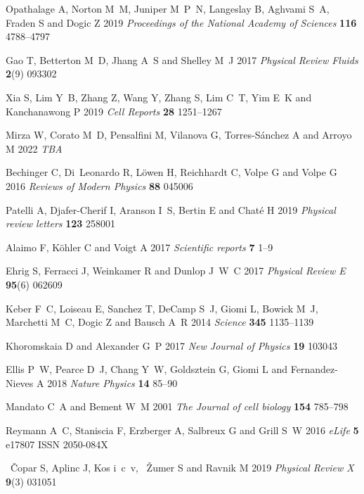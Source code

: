 \documentclass[12pt]{iopart}
\begin{document}
\begin{thebibliography}{100}
				Opathalage A, Norton M~M, Juniper M~P~N, Langeslay B, Aghvami S~A, Fraden S and
				  Dogic Z 2019 {\em Proceedings of the National Academy of Sciences\/} {\bf
				  116} 4788--4797
				
				Gao T, Betterton M~D, Jhang A~S and Shelley M~J 2017 {\em Physical Review Fluids\/}
				  {\bf 2}(9) 093302
				
				Xia S, Lim Y~B, Zhang Z, Wang Y, Zhang S, Lim C~T, Yim E~K and Kanchanawong P
				  2019 {\em Cell Reports\/} {\bf 28} 1251--1267
				
				Mirza W, Corato M~D, Pensalfini M, Vilanova G, Torres-S\'anchez A and Arroyo M
				  2022 {\em TBA\/}
				
				Bechinger C, Di~Leonardo R, L{\"o}wen H, Reichhardt C, Volpe G and Volpe G 2016
				  {\em Reviews of Modern Physics\/} {\bf 88} 045006
				
				Patelli A, Djafer-Cherif I, Aranson I~S, Bertin E and Chat{\'e} H 2019 {\em
				  Physical review letters\/} {\bf 123} 258001
				
				Alaimo F, K{\"o}hler C and Voigt A 2017 {\em Scientific reports\/} {\bf 7} 1--9
				
				Ehrig S, Ferracci J, Weinkamer R and Dunlop J~W~C 2017 {\em Physical Review E\/}
				  {\bf 95}(6) 062609
				
				Keber F~C, Loiseau E, Sanchez T, DeCamp S~J, Giomi L, Bowick M~J, Marchetti
				  M~C, Dogic Z and Bausch A~R 2014 {\em Science\/} {\bf 345} 1135--1139
				
				Khoromskaia D and Alexander G~P 2017 {\em New Journal of Physics\/} {\bf 19}
				  103043
				
				Ellis P~W, Pearce D~J, Chang Y~W, Goldsztein G, Giomi L and Fernandez-Nieves A
				  2018 {\em Nature Physics\/} {\bf 14} 85--90
				
				Mandato C~A and Bement W~M 2001 {\em The Journal of cell biology\/} {\bf 154}
				  785--798
				
				Reymann A~C, Staniscia F, Erzberger A, Salbreux G and Grill S~W 2016 {\em
				  eLife\/} {\bf 5} e17807 ISSN 2050-084X
				
				\ifmmode~\else \v{C}\fi{}opar S, Aplinc J, Kos i~c~v,
				  \ifmmode~\else \v{Z}\fi{}umer S and Ravnik M 2019 {\em Physical Review
				  X\/} {\bf 9}(3) 031051
				

\end{thebibliography}
\end{document}

